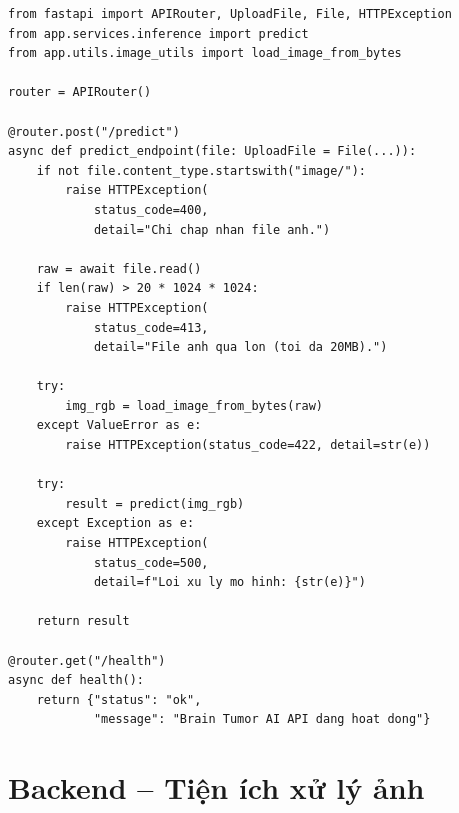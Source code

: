 \begin{lstlisting}[style=codePython, caption={REST API endpoint nhan anh MRI va tra ket qua phan tich (app/api/predict.py)}]
from fastapi import APIRouter, UploadFile, File, HTTPException
from app.services.inference import predict
from app.utils.image_utils import load_image_from_bytes

router = APIRouter()

@router.post("/predict")
async def predict_endpoint(file: UploadFile = File(...)):
    if not file.content_type.startswith("image/"):
        raise HTTPException(
            status_code=400,
            detail="Chi chap nhan file anh.")

    raw = await file.read()
    if len(raw) > 20 * 1024 * 1024:
        raise HTTPException(
            status_code=413,
            detail="File anh qua lon (toi da 20MB).")

    try:
        img_rgb = load_image_from_bytes(raw)
    except ValueError as e:
        raise HTTPException(status_code=422, detail=str(e))

    try:
        result = predict(img_rgb)
    except Exception as e:
        raise HTTPException(
            status_code=500,
            detail=f"Loi xu ly mo hinh: {str(e)}")

    return result

@router.get("/health")
async def health():
    return {"status": "ok",
            "message": "Brain Tumor AI API dang hoat dong"}
\end{lstlisting}

\section{Backend -- Tiện ích xử lý ảnh}

